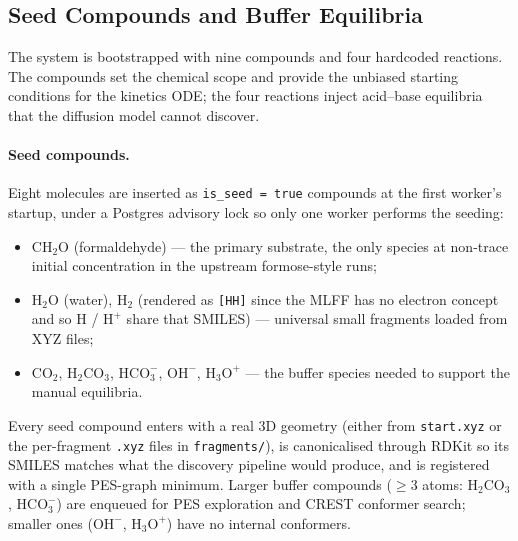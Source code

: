 %

\subsection{Seed Compounds and Buffer Equilibria}
\label{si:seed}

The system is bootstrapped with nine compounds and four hardcoded reactions. The compounds set the chemical scope and provide the unbiased starting conditions for the kinetics ODE; the four reactions inject acid--base equilibria that the diffusion model cannot discover.

\paragraph{Seed compounds.}
Eight molecules are inserted as \texttt{is\_seed = true} compounds at the first worker's startup, under a Postgres advisory lock so only one worker performs the seeding:
\begin{itemize}
    \item $\mathrm{CH_2O}$ (formaldehyde) --- the primary substrate, the only species at non-trace initial concentration in the upstream formose-style runs;
    \item $\mathrm{H_2O}$ (water), $\mathrm{H_2}$ (rendered as \texttt{[HH]} since the MLFF has no electron concept and so $\mathrm{H}$ / $\mathrm{H^+}$ share that SMILES) --- universal small fragments loaded from XYZ files;
    \item $\mathrm{CO_2}$, $\mathrm{H_2CO_3}$, $\mathrm{HCO_3^-}$, $\mathrm{OH^-}$, $\mathrm{H_3O^+}$ --- the buffer species needed to support the manual equilibria.
\end{itemize}
Every seed compound enters with a real 3D geometry (either from \texttt{start.xyz} or the per-fragment \texttt{.xyz} files in \texttt{fragments/}), is canonicalised through RDKit so its SMILES matches what the discovery pipeline would produce, and is registered with a single PES-graph minimum. Larger buffer compounds ($\geq 3$ atoms: $\mathrm{H_2CO_3}$, $\mathrm{HCO_3^-}$) are enqueued for PES exploration and CREST conformer search; smaller ones ($\mathrm{OH^-}$, $\mathrm{H_3O^+}$) have no internal conformers.

